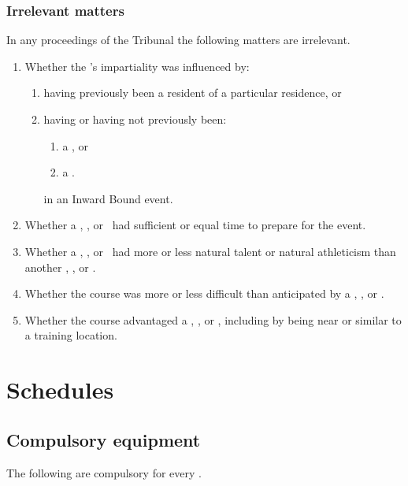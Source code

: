 \documentclass[12pt]{report}
\begin{document}
  \section{Irrelevant matters}
  \amended
  \begin{fenumerate}
    \item In any proceedings of the Tribunal the following matters are irrelevant.
    \begin{enumerate}
      \item Whether the \Referee's impartiality was influenced by:
      \begin{enumerate}
    \item having previously been a resident of a particular residence, or
    \item having or having not previously been:
    \begin{enumerate}
      \item a \competitor, or
      \item a \spectator.
    \end{enumerate}
    in an Inward Bound event.
  \end{enumerate}
  \item Whether a \competitor, \team, or \squad\ had sufficient or equal time to prepare for the event.
  \item Whether a \competitor, \team, or \squad\ had more or less natural talent or natural athleticism than another \competitor, \team, or \squad.
  \item Whether the course was more or less difficult than anticipated by a \competitor, \team, or \squad.
  \item Whether the course advantaged a \competitor, \team, or \squad, including by being near or similar to a training location.
    \end{enumerate}
  \end{fenumerate}

\cleardoublepage
  \appendix
  \part{Schedules}
  \renewcommand\thesection{}
  \renewcommand\appendixname{Schedule}
  \chapter{Compulsory equipment}\label{Sch:CompulsoryEquipment}
  The following are compulsory for every \team.
\end{document}
